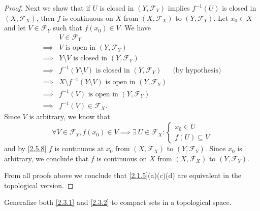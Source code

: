 \begin{proof}
  Next we show that if \(U\) is closed in \((Y, \mathcal{F}_Y)\) implies \(f^{-1}(U)\) is closed in \((X, \mathcal{F}_X)\), then \(f\) is continuous on \(X\) from \((X, \mathcal{F}_X)\) to \((Y, \mathcal{F}_Y)\).
  Let \(x_0 \in X\) and let \(V \in \mathcal{F}_Y\) such that \(f(x_0) \in V\).
  We have
  \begin{align*}
             & V \in \mathcal{F}_Y                                                                               \\
    \implies & V \text{ is open in } (Y, \mathcal{F}_Y)                                                          \\
    \implies & Y \setminus V \text{ is closed in } (Y, \mathcal{F}_Y)                                            \\
    \implies & f^{-1}(Y \setminus V) \text{ is closed in } (Y, \mathcal{F}_Y)           & \text{(by hypothesis)} \\
    \implies & X \setminus f^{-1}(Y \setminus V) \text{ is open in } (Y, \mathcal{F}_Y)                          \\
    \implies & f^{-1}(V) \text{ is open in } (Y, \mathcal{F}_Y)                                                  \\
    \implies & f^{-1}(V) \in \mathcal{F}_X.
  \end{align*}
  Since \(V\) is arbitrary, we know that
  \[
    \forall V \in \mathcal{F}_Y, f(x_0) \in V \implies \exists\ U \in \mathcal{F}_X : \begin{cases}
      x_0 \in U \\
      f(U) \subseteq V
    \end{cases}
  \]
  and by \cref{2.5.8} \(f\) is continuous at \(x_0\) from \((X, \mathcal{F}_X)\) to \((Y, \mathcal{F}_Y)\).
  Since \(x_0\) is arbitrary, we conclude that \(f\) is continuous on \(X\) from \((X, \mathcal{F}_X)\) to \((Y, \mathcal{F}_Y)\).

  From all proofs above we conclude that \cref{2.1.5}(a)(c)(d) are equivalent in the topological version.
\end{proof}

\begin{exercise}\label{ex 2.5.17}
  Generalize both \cref{2.3.1} and \cref{2.3.2} to compact sets in a topological space.
\end{exercise}

